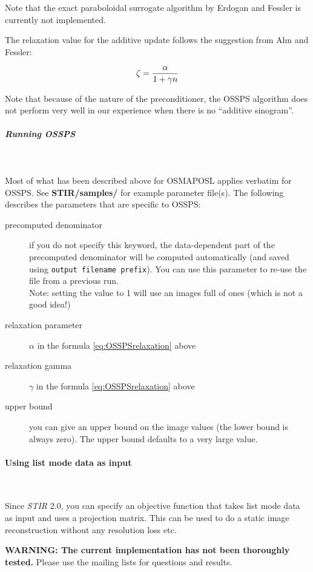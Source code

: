 \documentclass{article}
\newcommand{\subsubsubsection}[1]{\paragraph{#1}\mbox{} \\}
\newcommand{\subsubsubsubsection}[1]{\subparagraph{#1} \mbox{} \\}
\begin{document}
{  Note that the exact paraboloidal surrogate algorithm by Erdogan and Fessler is currently
  not implemented.

  The relaxation value for the additive update follows the suggestion from Ahn and Fessler:

 \begin{equation}
  \zeta= { \alpha \over 1+ \gamma n } \label{eq:OSSPSrelaxation}
 \end{equation} 

  Note that because of the nature of the preconditioner, the OSSPS algorithm does not
  perform very well in our experience when there is no ``additive sinogram''.

{ \subsubsubsubsection{Running OSSPS}
}

 Most of what has been described above for OSMAPOSL applies verbatim for OSSPS. 
 See \textbf{STIR/samples/} for example parameter file(s). The
 following describes the parameters that are specific to OSSPS:

 \begin{description}
 \item[precomputed denominator]
   if you do not specify this keyword, the data-dependent part of the
   precomputed denominator will be computed automatically (and saved using
   \texttt{output filename prefix}). You can use this parameter to
   re-use the file from a previous run. \\
   Note: setting the value to 1 will use an images full of ones (which is not a good idea!)

 \item[relaxation parameter]
   $\alpha$ in the formula \ref{eq:OSSPSrelaxation} above
 \item[relaxation gamma]
   $\gamma$ in the formula \ref{eq:OSSPSrelaxation} above

 \item[upper bound]
  you can give an upper bound on the image values (the lower bound is always zero). The upper
  bound defaults to a very large value.
\end{description}

{ \subsubsubsection{Using list mode data as input}
}
\label{sec:ListmodeIterativeAlgorithms}
Since \textit{STIR} 2.0, you can specify an objective function that takes list mode data as input
and uses a projection matrix. This can be used to do a static image reconstruction
without any resolution loss etc. 

\textbf{WARNING: The current implementation has not been thoroughly tested.} Please use
the mailing lists for questions and results.

}
\end{document}
